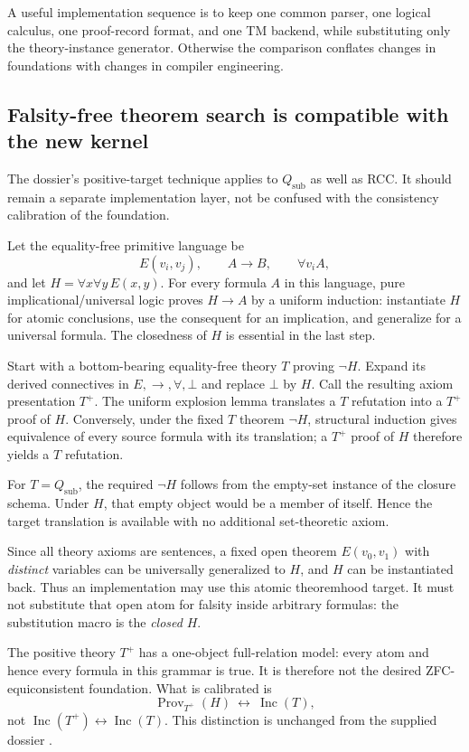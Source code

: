 \documentclass[11pt,letterpaper]{article}
\theoremstyle{definition}\newtheorem{definition}[theorem]{Definition}
\theoremstyle{remark}\newtheorem{remark}[theorem]{Remark}
\newcommand{\Inc}{\operatorname{Inc}}
\newcommand{\Prov}{\operatorname{Prov}}
\newcommand{\QTsub}{Q_{\mathrm{sub}}}
\begin{document}
A useful implementation sequence is to keep one common parser, one
logical calculus, one proof-record format, and one TM backend, while
substituting only the theory-instance generator. Otherwise the comparison
conflates changes in foundations with changes in compiler engineering.

\subsection{Falsity-free theorem search is compatible with the new kernel}

The dossier's positive-target technique applies to $\QTsub$ as well as
RCC. It should remain a separate implementation layer, not be confused
with the consistency calibration of the foundation.

Let the equality-free primitive language be
\[
 E(v_i,v_j),\qquad A\to B,\qquad\forall v_i A,
\]
and let $H=\forall x\forall y\,E(x,y)$. For every formula $A$ in this
language, pure implicational/universal logic proves $H\to A$ by a
uniform induction: instantiate $H$ for atomic conclusions, use the
consequent for an implication, and generalize for a universal formula.
The closedness of $H$ is essential in the last step.

Start with a bottom-bearing equality-free theory $T$ proving $\neg H$.
Expand its derived connectives in $E,\to,\forall,\bot$ and replace
$\bot$ by $H$. Call the resulting axiom presentation $T^+$.
The uniform explosion lemma translates a $T$ refutation into a
$T^+$ proof of $H$. Conversely, under the fixed $T$ theorem $\neg H$,
structural induction gives equivalence of every source formula with its
translation; a $T^+$ proof of $H$ therefore yields a $T$ refutation.

For $T=\QTsub$, the required $\neg H$ follows from the empty-set instance
of the closure schema. Under $H$, that empty object would be a member
of itself. Hence the target translation is available with no additional
set-theoretic axiom.

Since all theory axioms are sentences, a fixed open theorem
$E(v_0,v_1)$ with \emph{distinct} variables can be universally generalized
to $H$, and $H$ can be instantiated back. Thus an implementation may use
this atomic theoremhood target. It must not substitute that open atom
for falsity inside arbitrary formulas: the substitution macro is the
\emph{closed} $H$.

The positive theory $T^+$ has a one-object full-relation model: every
atom and hence every formula in this grammar is true. It is therefore
not the desired ZFC-equiconsistent foundation. What is calibrated is
\[
 \Prov_{T^+}(H)\ \leftrightarrow\ \Inc(T),
\]
not $\Inc(T^+)\leftrightarrow\Inc(T)$. This distinction is unchanged
from the supplied dossier \cite{prior2}.
\end{document}
